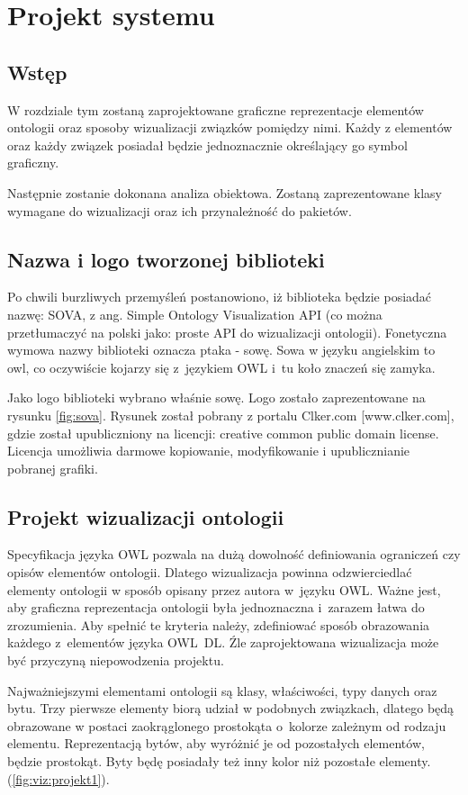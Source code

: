 \chapter{Projekt systemu}
\section{Wstęp}
W rozdziale tym zostaną zaprojektowane graficzne reprezentacje elementów ontologii oraz sposoby wizualizacji związków pomiędzy nimi. Każdy z elementów 
oraz każdy związek posiadał będzie jednoznacznie określający go symbol graficzny. 
\par 
Następnie zostanie dokonana analiza obiektowa. Zostaną zaprezentowane klasy wymagane do wizualizacji oraz ich przynależność do pakietów.   
\section{Nazwa i logo tworzonej biblioteki}

Po chwili burzliwych przemyśleń postanowiono, iż biblioteka będzie posiadać nazwę: SOVA, z ang. Simple Ontology Visualization API (co można przetłumaczyć na polski
jako: proste API do wizualizacji ontologii). Fonetyczna wymowa nazwy biblioteki oznacza ptaka - sowę. Sowa w języku angielskim to owl, co oczywiście kojarzy się 
z~językiem OWL i~tu koło znaczeń się zamyka. 
\par Jako logo biblioteki wybrano właśnie sowę. Logo zostało zaprezentowane na rysunku \ref{fig:sova}. Rysunek został pobrany z portalu Clker.com [www.clker.com], gdzie został 
upubliczniony na licencji: creative common public domain license. Licencja umożliwia darmowe kopiowanie, modyfikowanie i upublicznianie pobranej grafiki.


\section{Projekt wizualizacji ontologii}

Specyfikacja języka OWL pozwala na dużą dowolność definiowania ograniczeń czy opisów elementów ontologii. Dlatego wizualizacja powinna 
odzwierciedlać elementy ontologii w sposób opisany przez autora w~języku OWL. Ważne jest, aby graficzna reprezentacja ontologii 
była jednoznaczna i~zarazem łatwa do zrozumienia. Aby spełnić te kryteria należy, zdefiniować sposób obrazowania każdego z~elementów języka OWL~DL.
Źle zaprojektowana wizualizacja może być przyczyną niepowodzenia projektu. 
\par Najważniejszymi elementami ontologii są klasy, właściwości, typy danych oraz bytu. Trzy pierwsze elementy biorą udział w podobnych związkach, dlatego
 będą obrazowane w postaci zaokrąglonego prostokąta o~kolorze zależnym od rodzaju elementu. Reprezentacją bytów, aby wyróżnić je od pozostałych 
elementów, będzie prostokąt. Byty będę posiadały też inny kolor niż pozostałe elementy. (\figurename \space \ref{fig:viz:projekt1}).

